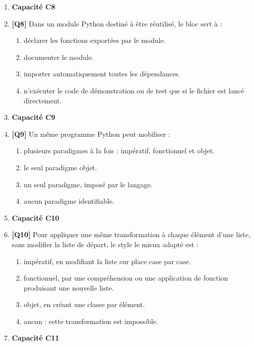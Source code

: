 \begin{enumerate}
\item[] \textbf{Capacité C8}

\item \textbf{[Q8]} Dans un module Python destiné à être réutilisé, le bloc  sert à :
  \begin{enumerate}[label=\Alph*.]
    \item déclarer les fonctions exportées par le module.
    \item documenter le module.
    \item importer automatiquement toutes les dépendances.
    \item n'exécuter le code de démonstration ou de test que si le fichier est lancé directement.
  \end{enumerate}

\item[] \textbf{Capacité C9}

\item \textbf{[Q9]} Un même programme Python peut mobiliser :
  \begin{enumerate}[label=\Alph*.]
    \item plusieurs paradigmes à la fois : impératif, fonctionnel et objet.
    \item le seul paradigme objet.
    \item un seul paradigme, imposé par le langage.
    \item aucun paradigme identifiable.
  \end{enumerate}

\item[] \textbf{Capacité C10}

\item \textbf{[Q10]} Pour appliquer une même transformation à chaque élément d'une liste, sans modifier la liste de départ, le style le mieux adapté est :
  \begin{enumerate}[label=\Alph*.]
    \item impératif, en modifiant la liste sur place case par case.
    \item fonctionnel, par une compréhension ou une application de fonction produisant une nouvelle liste.
    \item objet, en créant une classe par élément.
    \item aucun : cette transformation est impossible.
  \end{enumerate}

\item[] \textbf{Capacité C11}


\end{enumerate}
